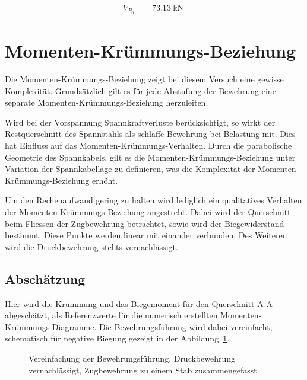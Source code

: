 \documentclass[
  11pt,
  letterpaper,
]{scrreprt}
\begin{document}
$$
\begin{aligned}
V_{P_{0}} &= 73.13\ \mathrm{kN} \;
\end{aligned}
$$

\section{Momenten-Krümmungs-Beziehung}\label{momenten-kruxfcmmungs-beziehung}

Die Momenten-Krümmungs-Beziehung zeigt bei diesem Versuch eine gewisse
Komplexität. Grundsätzlich gilt es für jede Abstufung der Bewehrung eine
separate Momenten-Krümmungs-Beziehung herzuleiten.

Wird bei der Vorspannung Spannkraftverluste berücksichtigt, so wirkt der
Restquerschnitt des Spannstahls als schlaffe Bewehrung bei Belastung
mit. Dies hat Einfluss auf das Momenten-Krümmungs-Verhalten. Durch die
parabolische Geometrie des Spannkabels, gilt es die
Momenten-Krümmungs-Beziehung unter Variation der Spannkabellage zu
definieren, was die Komplexität der Momenten-Krümmungs-Beziehung erhöht.

Um den Rechenaufwand gering zu halten wird lediglich ein qualitatives
Verhalten der Momenten-Krümmungs-Beziehung angestrebt. Dabei wird der
Querschnitt beim Fliessen der Zugbewehrung betrachtet, sowie wird der
Biegewiderstand bestimmt. Diese Punkte werden linear mit einander
verbunden. Des Weiteren wird die Druckbewehrung stehts vernachlässigt.

\subsection{Abschätzung}\label{abschuxe4tzung}

Hier wird die Krümmung und das Biegemoment für den Querschnitt A-A
abgeschätzt, als Referenzwerte für die numerisch erstellten
Momenten-Krümmungs-Diagramme. Die Bewehrungsführung wird dabei
vereinfacht, schematisch für negative Biegung gezeigt in der
Abbildung~\ref{fig-t6_qs_approx}.

\begin{figure}[H]


\caption{\label{fig-t6_qs_approx}Vereinfachung der Bewehrungsführung,
Druckbewehrung vernachlässigt, Zugbewehrung zu einem Stab
zusammengefasst}

\end{figure}%
\end{document}
